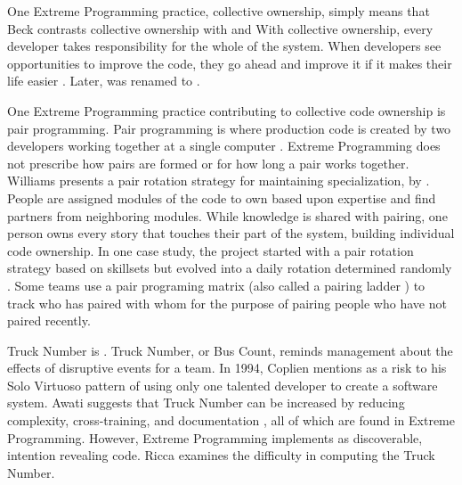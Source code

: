 One Extreme Programming practice, collective ownership, simply means that  Beck contrasts collective ownership with  and  With collective ownership, every developer takes responsibility for the whole of the system. When developers see opportunities to improve the code, they go ahead and improve it if it makes their life easier \cite{BeckExtremeProgramming2000}. Later,  was renamed to  \cite{BeckExtremeProgramming2004}. 

One Extreme Programming practice contributing to collective code ownership is pair programming. Pair programming is where production code is created by two developers working together at a single computer \cite{BeckExtremeProgramming2004}. Extreme Programming does not prescribe how pairs are formed or for how long a pair works together. Williams presents a pair rotation strategy for maintaining specialization, by   \cite{Williams2002}. People are assigned modules of the code to own based upon expertise and find partners from neighboring modules. While knowledge is shared with pairing, one person owns every story that touches their part of the system, building individual code ownership. In one case study, the project started with a pair rotation strategy based on skillsets but evolved into a daily rotation determined randomly \cite{Vanhanen2007}. Some teams use a pair programing matrix \cite{AlaverdyanPairProgrammingMatrix} (also called a pairing ladder \cite{Davies2009AgileCoaching}) to track who has paired with whom for the purpose of pairing people who have not paired recently.

Truck Number is  \cite{WikiTruckNumber}. Truck Number, or Bus Count, reminds management about the effects of disruptive events for a team. In 1994, Coplien \cite{Coplien1994} mentions  as a risk to his Solo Virtuoso pattern of using only one talented developer to create a software system. Awati suggests that Truck Number can be increased by reducing complexity, cross-training, and documentation \cite{AwatiBusFactor}, all of which are found in Extreme Programming. However, Extreme Programming implements  as discoverable, intention revealing code. Ricca \cite{Ricca2011TruckFactor} examines the difficulty in computing the Truck Number. 

